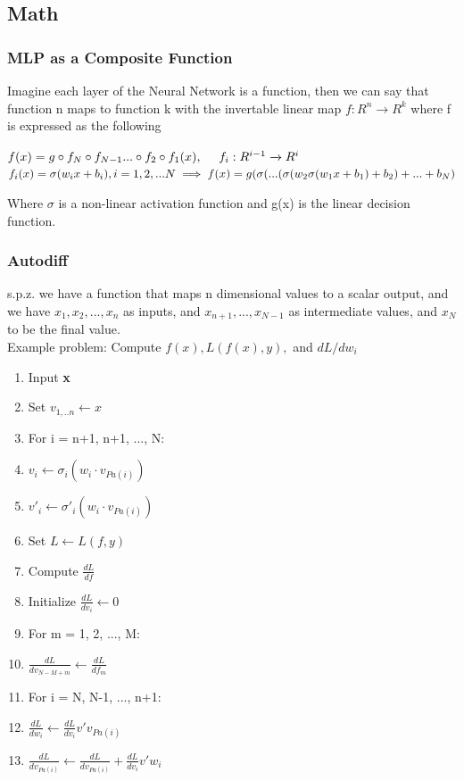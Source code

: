 \documentclass[article]{llncs}
\begin{document}
\subsection{Math}
\subsubsection{MLP as a Composite Function}
Imagine each layer of the Neural Network is a function, then we can say that function n maps to function k with the invertable linear map $f: R^n \xrightarrow{} R^k$ where f is expressed as the following
\begin{theorem}
    $f(x) = g \circ f_N \circ f_{N-1} ... \circ f_2 \circ f_1(x), \-\ \-\ \-\ \-\  f_i : R^{i-1} \xrightarrow{} R^i \\ $  $ f_i(x) = \sigma (w_ix+b_i), i = 1,2,...N \\ \implies f(x) = g(\sigma(...(\sigma(w_2\sigma(w_1x+b_1)+b_2)+...+b_N)$
\end{theorem}
Where $\sigma$ is a non-linear activation function and g(x) is the linear decision function.
\subsubsection{Autodiff}
s.p.z. we have a function that maps n dimensional values to a scalar output, and we have $x_1, x_2, ... , x_n$ as inputs, and $x_{n+1}, ... , x_{N-1}$ as intermediate values, and $x_N$ to be the final value.  \\
Example problem: Compute $f(x), L(f(x),y),$ and $dL/dw_i$
\begin{enumerate}
    \item Input \textbf{x}
    \item Set $v_{1,..n} \xleftarrow{} x$
    \item For i = n+1, n+1, ..., N:
    \item[] \centering $v_i \xleftarrow{} \sigma_i(w_i \cdot v_{Pa(i)})$
    \item[] \centering $v'_i \xleftarrow{} \sigma'_i(w_i \cdot v_{Pa(i)})$
    \item \raggedright Set $L \xleftarrow{} L(f,y)$
    \item Compute $\frac{dL}{df}$
    \item Initialize $\frac{dL}{dv_i} \xleftarrow{} 0$
    \item For m = 1, 2, ..., M:
    \item[] \centering $\frac{dL}{dv_{N-M+m}} \xleftarrow[]{} \frac{dL}{df_m}$
    \item \raggedright For i = N, N-1, ..., n+1:
    \item[] \centering $\frac{dL}{dw_i} \xleftarrow{} \frac{dL}{dv_i} v' v_{Pa(i)}$
    \item[] \centering $\frac{dL}{dv_{Pa(i)}} \xleftarrow{} \frac{dL}{dv_{Pa(i)}} + \frac{dL}{dv_i} v' w_{i} $
\end{enumerate}
\end{document}
